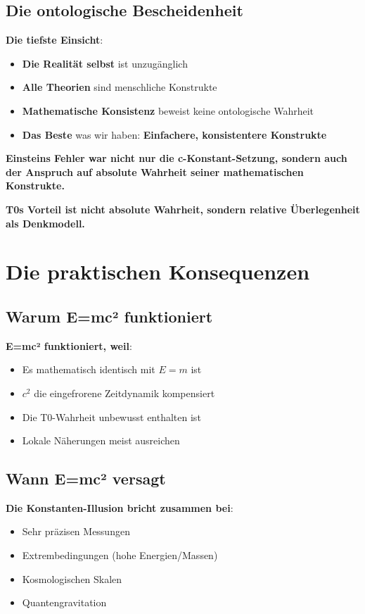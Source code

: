 \documentclass[12pt,a4paper]{article}
\begin{document}
	\subsection{Die ontologische Bescheidenheit}
	
	\textbf{Die tiefste Einsicht}:
	\begin{itemize}
		\item \textbf{Die Realität selbst} ist unzugänglich
		\item \textbf{Alle Theorien} sind menschliche Konstrukte
		\item \textbf{Mathematische Konsistenz} beweist keine ontologische Wahrheit
		\item \textbf{Das Beste} was wir haben: \textbf{Einfachere, konsistentere Konstrukte}
	\end{itemize}
	
	\textbf{Einsteins Fehler war nicht nur die c-Konstant-Setzung, sondern auch der Anspruch auf absolute Wahrheit seiner mathematischen Konstrukte.}
	
	\textbf{T0s Vorteil ist nicht absolute Wahrheit, sondern relative Überlegenheit als Denkmodell.}
	
	\section{Die praktischen Konsequenzen}
	
	\subsection{Warum E=mc² funktioniert}
	
	\textbf{E=mc² funktioniert, weil}:
	\begin{itemize}
		\item Es mathematisch identisch mit $E = m$ ist
		\item $c^2$ die eingefrorene Zeitdynamik kompensiert
		\item Die T0-Wahrheit unbewusst enthalten ist
		\item Lokale Näherungen meist ausreichen
	\end{itemize}
	
	\subsection{Wann E=mc² versagt}
	
	\textbf{Die Konstanten-Illusion bricht zusammen bei}:
	\begin{itemize}
		\item Sehr präzisen Messungen
		\item Extrembedingungen (hohe Energien/Massen)
		\item Kosmologischen Skalen
		\item Quantengravitation
	\end{itemize}
	
\end{document}
